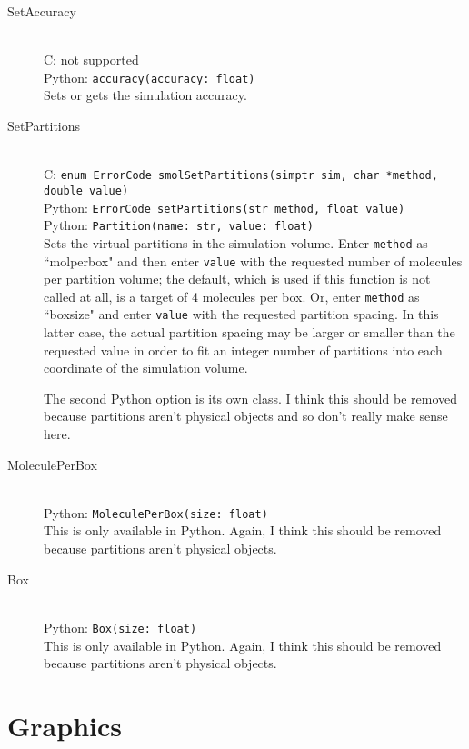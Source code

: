 \documentclass {book}
\newcommand {\ttt} {\texttt}
\begin{document}
\begin{description}
\item[SetAccuracy]
\hfill \\
C: not supported\\
Python: \ttt{accuracy(accuracy: float)}\\
Sets or gets the simulation accuracy.

\item[SetPartitions]
\hfill \\
C: \ttt{enum ErrorCode smolSetPartitions(simptr sim, char *method, double value)}\\
Python: \ttt{ErrorCode setPartitions(str method, float value)}\\
Python: \ttt{Partition(name: str, value: float)}\\
Sets the virtual partitions in the simulation volume. Enter \ttt{method} as ``molperbox" and then enter \ttt{value} with the requested number of molecules per partition volume; the default, which is used if this function is not called at all, is a target of 4 molecules per box. Or, enter \ttt{method} as ``boxsize" and enter \ttt{value} with the requested partition spacing. In this latter case, the actual partition spacing may be larger or smaller than the requested value in order to fit an integer number of partitions into each coordinate of the simulation volume.

The second Python option is its own class. I think this should be removed because partitions aren't physical objects and so don't really make sense here.

\item[MoleculePerBox]
\hfill \\
Python: \ttt{MoleculePerBox(size: float)}\\
This is only available in Python. Again, I think this should be removed because partitions aren't physical objects.

\item[Box]
\hfill \\
Python: \ttt{Box(size: float)}\\
This is only available in Python. Again, I think this should be removed because partitions aren't physical objects.


\end{description}

\section{Graphics}
\end{document}
